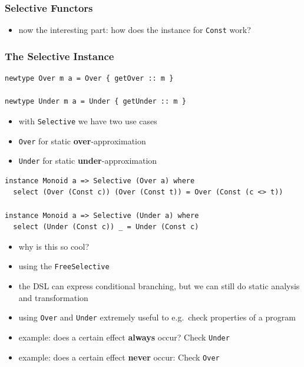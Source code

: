 \documentclass[aspectratio=169]{beamer}
\begin{document}
\begin{frame}
  \frametitle{Selective Functors}
\end{frame}

\begin{frame}[fragile]
  \begin{itemize}
  \item now the interesting part: how does the instance for \texttt{Const} work?
  \end{itemize}
\end{frame}

\begin{frame}[fragile]
  \frametitle{The Selective Instance}
  \begin{verbatim}
newtype Over m a = Over { getOver :: m }

newtype Under m a = Under { getUnder :: m }
  \end{verbatim}
  \vfill
  \begin{itemize}
  \item with \texttt{Selective} we have two use cases
  \item \texttt{Over} for static \textbf{over}-approximation
  \item \texttt{Under} for static \textbf{under}-approximation
  \end{itemize}
\end{frame}

\begin{frame}[fragile]
  \begin{verbatim}
instance Monoid a => Selective (Over a) where
  select (Over (Const c)) (Over (Const t)) = Over (Const (c <> t))

instance Monoid a => Selective (Under a) where
  select (Under (Const c)) _ = Under (Const c)
  \end{verbatim}
\end{frame}

\begin{frame}[fragile]
  \begin{itemize}
  \item why is this so cool?
  \item using the \texttt{FreeSelective}
  \item the DSL can express conditional branching, but we can still do
    static analysis and transformation
  \item using \texttt{Over} and \texttt{Under} extremely useful to e.g.\ check properties of a program
  \item example: does a certain effect \textbf{always} occur? Check \texttt{Under}
  \item example: does a certain effect \textbf{never} occur: Check \texttt{Over}
  \end{itemize}
\end{frame}
\end{document}
